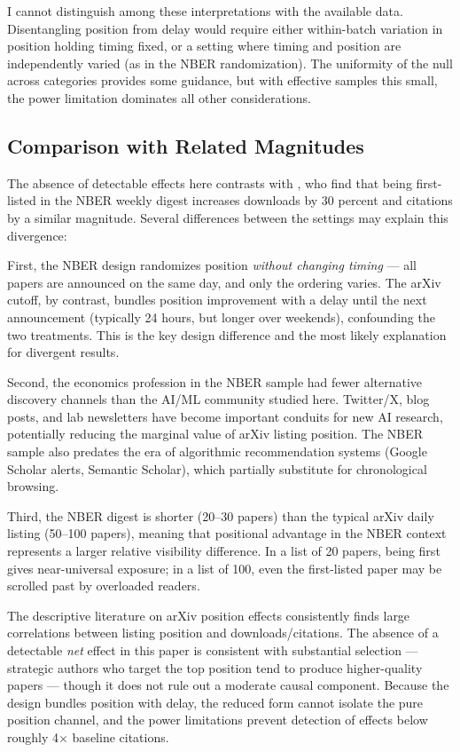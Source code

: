 \documentclass[12pt]{article}
\begin{document}
I cannot distinguish among these interpretations with the available data. Disentangling position from delay would require either within-batch variation in position holding timing fixed, or a setting where timing and position are independently varied (as in the NBER randomization). The uniformity of the null across categories provides some guidance, but with effective samples this small, the power limitation dominates all other considerations.

\subsection{Comparison with Related Magnitudes}

The absence of detectable effects here contrasts with \citet{feenberg2017}, who find that being first-listed in the NBER weekly digest increases downloads by 30 percent and citations by a similar magnitude. Several differences between the settings may explain this divergence:

First, the NBER design randomizes position \textit{without changing timing} --- all papers are announced on the same day, and only the ordering varies. The arXiv cutoff, by contrast, bundles position improvement with a delay until the next announcement (typically 24 hours, but longer over weekends), confounding the two treatments. This is the key design difference and the most likely explanation for divergent results.

Second, the economics profession in the NBER sample had fewer alternative discovery channels than the AI/ML community studied here. Twitter/X, blog posts, and lab newsletters have become important conduits for new AI research, potentially reducing the marginal value of arXiv listing position. The NBER sample also predates the era of algorithmic recommendation systems (Google Scholar alerts, Semantic Scholar), which partially substitute for chronological browsing.

Third, the NBER digest is shorter (20--30 papers) than the typical arXiv daily listing (50--100 papers), meaning that positional advantage in the NBER context represents a larger relative visibility difference. In a list of 20 papers, being first gives near-universal exposure; in a list of 100, even the first-listed paper may be scrolled past by overloaded readers.

The descriptive literature on arXiv position effects \citep{haque2009, haque2010, dietrich2008} consistently finds large correlations between listing position and downloads/citations. The absence of a detectable \textit{net} effect in this paper is consistent with substantial selection --- strategic authors who target the top position tend to produce higher-quality papers --- though it does not rule out a moderate causal component. Because the design bundles position with delay, the reduced form cannot isolate the pure position channel, and the power limitations prevent detection of effects below roughly 4$\times$ baseline citations.
\end{document}
